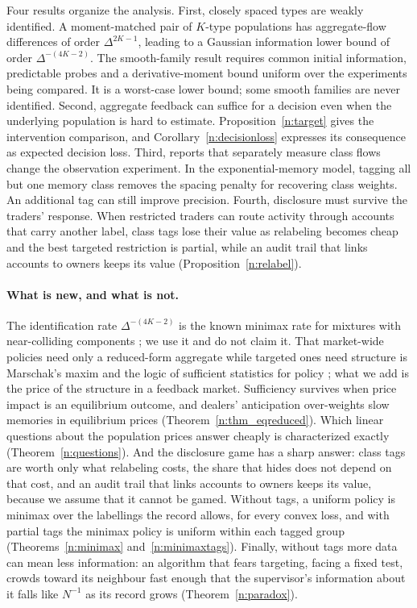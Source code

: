 \documentclass[12pt]{article}
\theoremstyle{definition}
\theoremstyle{remark}
\begin{document}
    Four results organize the analysis. First, closely spaced types are weakly identified. A moment-matched pair of $K$-type populations has aggregate-flow differences of order $\Delta^{2K-1}$, leading to a Gaussian information lower bound of order $\Delta^{-(4K-2)}$. The smooth-family result requires common initial information, predictable probes and a derivative-moment bound uniform over the experiments being compared. It is a worst-case lower bound; some smooth families are never identified. Second, aggregate feedback can suffice for a decision even when the underlying population is hard to estimate. Proposition~\ref{n:target} gives the intervention comparison, and Corollary~\ref{n:decisionloss} expresses its consequence as expected decision loss. Third, reports that separately measure class flows change the observation experiment. In the exponential-memory model, tagging all but one memory class removes the spacing penalty for recovering class weights. An additional tag can still improve precision. Fourth, disclosure must survive the traders' response. When restricted traders can route activity through accounts that carry another label, class tags lose their value as relabeling becomes cheap and the best targeted restriction is partial, while an audit trail that links accounts to owners keeps its value (Proposition~\ref{n:relabel}).

\paragraph{What is new, and what is not.} The identification rate $\Delta^{-(4K-2)}$ is the known minimax rate for mixtures with near-colliding components \citep{heinrich2018,wu2020}; we use it and do not claim it. That market-wide policies need only a reduced-form aggregate while targeted ones need structure is Marschak's maxim and the logic of sufficient statistics for policy \citep{marschak1953,chetty2009}; what we add is the price of the structure in a feedback market. Sufficiency survives when price impact is an equilibrium outcome, and dealers' anticipation over-weights slow memories in equilibrium prices (Theorem~\ref{n:thm_eqreduced}). Which linear questions about the population prices answer cheaply is characterized exactly (Theorem~\ref{n:questions}). And the disclosure game has a sharp answer: class tags are worth only what relabeling costs, the share that hides does not depend on that cost, and an audit trail that links accounts to owners keeps its value, because we assume that it cannot be gamed. Without tags, a uniform policy is minimax over the labellings the record allows, for every convex loss, and with partial tags the minimax policy is uniform within each tagged group (Theorems~\ref{n:minimax} and~\ref{n:minimaxtags}). Finally, without tags more data can mean less information: an algorithm that fears targeting, facing a fixed test, crowds toward its neighbour fast enough that the supervisor's information about it falls like $N^{-1}$ as its record grows (Theorem~\ref{n:paradox}).
\end{document}
